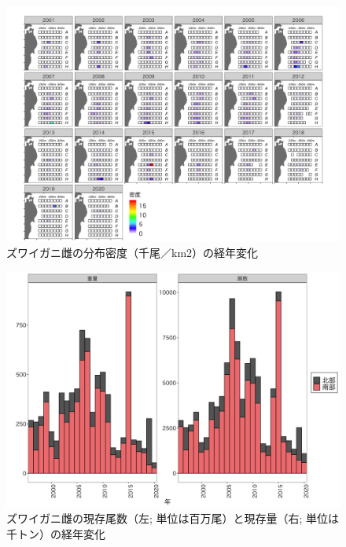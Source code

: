 \documentclass[11pt]{article} %
\begin{document}
\begin{linenumbers}
\begin{figure}[h]
  \centering
  \includegraphics[width = 14cm]{ズワイガニ雌dens.png}
  \caption{ズワイガニ雌の分布密度（千尾／km2）の経年変化}
\end{figure}

\begin{figure}[h]
  \centering
  \includegraphics[width = 14cm]{ズワイガニ雌trend.png}
  \caption{ズワイガニ雌の現存尾数（左; 単位は百万尾）と現存量（右; 単位は千トン）の経年変化}
\end{figure}


\end{linenumbers}
\end{document}
